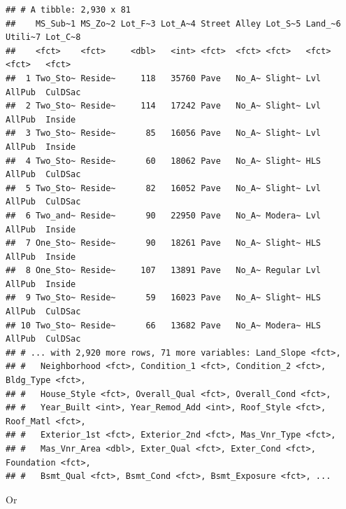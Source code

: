\documentclass[
]{book}
\newenvironment{Shaded}{\begin{snugshade}}{\end{snugshade}}
\newcommand{\FunctionTok}[1]{\textcolor[rgb]{0.00,0.00,0.00}{#1}}
\newcommand{\NormalTok}[1]{#1}
\newcommand{\OtherTok}[1]{\textcolor[rgb]{0.56,0.35,0.01}{#1}}
\newcommand{\SpecialCharTok}[1]{\textcolor[rgb]{0.00,0.00,0.00}{#1}}
\theoremstyle{definition}
\theoremstyle{definition}
\theoremstyle{definition}
\theoremstyle{definition}
\theoremstyle{remark}
\begin{document}
\begin{verbatim}
## # A tibble: 2,930 x 81
##    MS_Sub~1 MS_Zo~2 Lot_F~3 Lot_A~4 Street Alley Lot_S~5 Land_~6 Utili~7 Lot_C~8
##    <fct>    <fct>     <dbl>   <int> <fct>  <fct> <fct>   <fct>   <fct>   <fct>  
##  1 Two_Sto~ Reside~     118   35760 Pave   No_A~ Slight~ Lvl     AllPub  CulDSac
##  2 Two_Sto~ Reside~     114   17242 Pave   No_A~ Slight~ Lvl     AllPub  Inside 
##  3 Two_Sto~ Reside~      85   16056 Pave   No_A~ Slight~ Lvl     AllPub  Inside 
##  4 Two_Sto~ Reside~      60   18062 Pave   No_A~ Slight~ HLS     AllPub  CulDSac
##  5 Two_Sto~ Reside~      82   16052 Pave   No_A~ Slight~ Lvl     AllPub  CulDSac
##  6 Two_and~ Reside~      90   22950 Pave   No_A~ Modera~ Lvl     AllPub  Inside 
##  7 One_Sto~ Reside~      90   18261 Pave   No_A~ Slight~ HLS     AllPub  Inside 
##  8 One_Sto~ Reside~     107   13891 Pave   No_A~ Regular Lvl     AllPub  Inside 
##  9 Two_Sto~ Reside~      59   16023 Pave   No_A~ Slight~ HLS     AllPub  CulDSac
## 10 Two_Sto~ Reside~      66   13682 Pave   No_A~ Modera~ HLS     AllPub  CulDSac
## # ... with 2,920 more rows, 71 more variables: Land_Slope <fct>,
## #   Neighborhood <fct>, Condition_1 <fct>, Condition_2 <fct>, Bldg_Type <fct>,
## #   House_Style <fct>, Overall_Qual <fct>, Overall_Cond <fct>,
## #   Year_Built <int>, Year_Remod_Add <int>, Roof_Style <fct>, Roof_Matl <fct>,
## #   Exterior_1st <fct>, Exterior_2nd <fct>, Mas_Vnr_Type <fct>,
## #   Mas_Vnr_Area <dbl>, Exter_Qual <fct>, Exter_Cond <fct>, Foundation <fct>,
## #   Bsmt_Qual <fct>, Bsmt_Cond <fct>, Bsmt_Exposure <fct>, ...
\end{verbatim}

Or

\begin{Shaded}
\end{Shaded}
\end{document}
